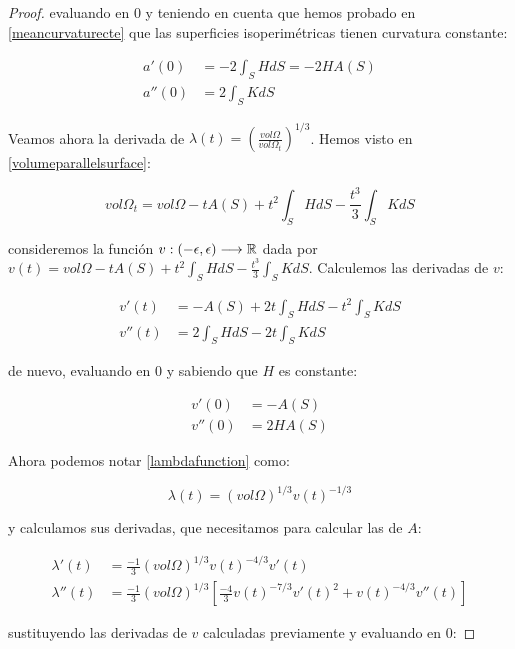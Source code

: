 \begin{proof}
evaluando en 0 y teniendo en cuenta que hemos probado en \autoref{meancurvaturecte} que las superficies isoperimétricas tienen curvatura constante:

\begin{align*}
    a'(0) &= -2\int_{S} HdS = -2HA(S) \\
    a''(0) &= 2\int_{S} KdS
\end{align*}

Veamos ahora la derivada de $\lambda(t) = \left( \frac{vol \Omega}{vol \Omega_t} \right) ^{1/3}$. Hemos visto en \autoref{volumeparallelsurface}:

\begin{equation*}
    vol \Omega_t = vol \Omega - tA(S) + t^2\int_S HdS - \frac{t^3}{3}\int_S KdS
\end{equation*}

consideremos la función $v: (-\epsilon, \epsilon) \longrightarrow \mathbb{R}$ dada por $v(t) = vol \Omega - tA(S) + t^2\int_S HdS - \frac{t^3}{3}\int_S KdS$. Calculemos las derivadas de $v$:

\begin{align*}
    v'(t) &= - A(S) + 2t\int_S HdS - t^2\int_S KdS \\
    v''(t) &= 2\int_{S} HdS - 2t\int_S KdS
\end{align*}

de nuevo, evaluando en 0 y sabiendo que $H$ es constante:

\begin{align*}
    v'(0) &= -A(S) \\
    v''(0) &= 2HA(S)
\end{align*}

Ahora podemos notar \autoref{lambdafunction} como:

\begin{equation*}
    \lambda(t) = (vol \Omega)^{1/3} v(t)^{-1/3}
\end{equation*}

y calculamos sus derivadas, que necesitamos para calcular las de $A$:

\begin{align*}
    \lambda'(t) &= \frac{-1}{3} (vol\Omega)^{1/3} v(t)^{-4/3} v'(t) \\
    \lambda''(t) &= \frac{-1}{3} (vol\Omega)^{1/3} \left[ \frac{-4}{3}v(t)^{-7/3} v'(t)^2 + v(t)^{-4/3}v''(t) \right]
\end{align*}

sustituyendo las derivadas de $v$ calculadas previamente y evaluando en 0:


\end{proof}
